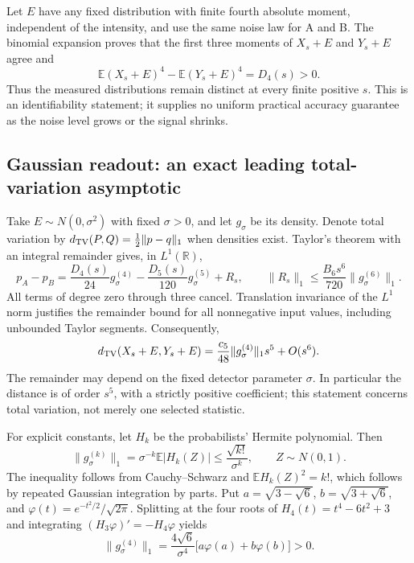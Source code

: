 Let $E$ have any fixed distribution with finite fourth absolute moment,
independent of the intensity, and use the same noise law for A and B.
The binomial expansion proves that the first three moments of $X_s+E$
and $Y_s+E$ agree and
\[
 \mathbb E(X_s+E)^4-\mathbb E(Y_s+E)^4=D_4(s)>0.
\]
Thus the measured distributions remain distinct at every finite positive
$s$. This is an identifiability statement; it supplies no uniform practical
accuracy guarantee as the noise level grows or the signal shrinks.

\subsection{Gaussian readout: an exact leading total-variation asymptotic}

Take $E\sim N(0,\sigma^2)$ with fixed $\sigma>0$, and let $g_\sigma$ be its
density. Denote total variation by $d_{\rm TV}(P,Q)=\tfrac12\|p-q\|_1$
when densities exist. Taylor's theorem with an integral remainder gives,
in $L^1(\mathbb R)$,
\[
 p_A-p_B=\frac{D_4(s)}{24}g_\sigma^{(4)}
             -\frac{D_5(s)}{120}g_\sigma^{(5)}+R_s,
 \qquad
 \|R_s\|_1\le\frac{B_6s^6}{720}\|g_\sigma^{(6)}\|_1.
\]
All terms of degree zero through three cancel. Translation invariance of
the $L^1$ norm justifies the remainder bound for all nonnegative input
values, including unbounded Taylor segments. Consequently,
\begin{equation}\label{eq:gaussian-asymptotic}
 d_{\rm TV}(X_s+E,Y_s+E)
 =\frac{c_5}{48}\|g_\sigma^{(4)}\|_1s^5+O(s^6).
\end{equation}
The remainder may depend on the fixed detector parameter $\sigma$.
In particular the distance is of order $s^5$, with a strictly positive
coefficient; this statement concerns total variation, not merely one
selected statistic.

For explicit constants, let $H_k$ be the probabilists' Hermite polynomial.
Then
\[
 \|g_\sigma^{(k)}\|_1
 =\sigma^{-k}\mathbb E|H_k(Z)|\le\frac{\sqrt{k!}}{\sigma^k},
 \qquad Z\sim N(0,1).
\]
The inequality follows from Cauchy--Schwarz and
$\mathbb E H_k(Z)^2=k!$, which follows by repeated Gaussian integration
by parts. Put $a=\sqrt{3-\sqrt6}$, $b=\sqrt{3+\sqrt6}$, and
$\varphi(t)=e^{-t^2/2}/\sqrt{2\pi}$. Splitting at the four roots of
$H_4(t)=t^4-6t^2+3$ and integrating
$(H_3\varphi)'=-H_4\varphi$ yields
\[
 \|g_\sigma^{(4)}\|_1
 =\frac{4\sqrt6}{\sigma^4}\bigl[a\varphi(a)+b\varphi(b)\bigr]>0.
\]

